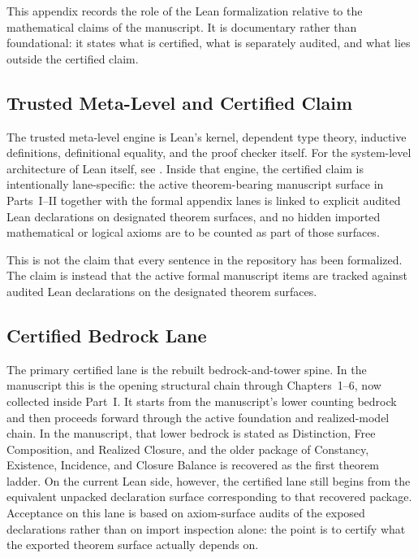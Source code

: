 \label{sec:formal-certification-boundary}

This appendix records the role of the Lean formalization relative to the
mathematical claims of the manuscript. It is documentary rather than foundational:
it states what is certified, what is separately audited, and what lies outside
the certified claim.

\subsection{Trusted Meta-Level and Certified Claim}
\label{subsec:formal-trust-boundary}

The trusted meta-level engine is Lean's kernel, dependent type theory,
inductive definitions, definitional equality, and the proof checker itself.
For the system-level architecture of Lean itself, see
\cite{deMouraKongAvigadEtAl2015}.
Inside that engine, the certified claim is intentionally lane-specific: the
active theorem-bearing manuscript surface in Parts~I--II together with the
formal appendix lanes is linked to explicit
audited Lean declarations on designated theorem surfaces, and no hidden
imported mathematical or logical axioms are to be counted as part of those
surfaces.

This is not the claim that every sentence in the repository has been
formalized. The claim is instead that the active formal manuscript items are
tracked against audited Lean declarations on the designated theorem surfaces.

\subsection{Certified Bedrock Lane}
\label{subsec:formal-bedrock-lane}

The primary certified lane is the rebuilt bedrock-and-tower spine. In the
manuscript this is the opening structural chain through Chapters~1--6, now
collected inside Part~I. It starts from the manuscript's lower counting
bedrock and then proceeds forward through the active foundation and
realized-model chain. In the manuscript, that lower bedrock is stated as
Distinction, Free Composition, and Realized Closure, and the older package of
Constancy, Existence, Incidence, and Closure Balance is recovered as the first
theorem ladder. On the current Lean side, however, the certified lane still
begins from the equivalent unpacked declaration surface corresponding to that
recovered package. Acceptance on this lane is based on axiom-surface audits of
the exposed declarations rather than on import inspection alone: the point is
to certify what the exported theorem surface actually depends on.

